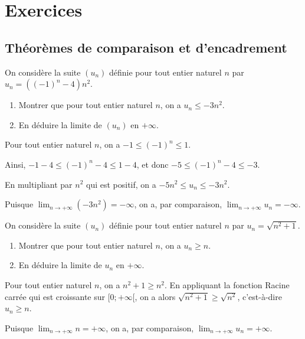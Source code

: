 \documentclass[11pt,fleqn, openany]{book} %
\begin{document}


\chapter{Exercices}


\section*{Théorèmes de comparaison et d'encadrement}

\begin{exercise}On considère la suite $(u_n)$ définie pour tout entier naturel $n$ par $u_n=((-1)^n-4)n^2$.
\begin{enumerate}
\item Montrer que pour tout entier naturel $n$, on a $u_n \leqslant -3n^2$.
\item En déduire la limite de $(u_n)$ en $+\infty$.
\end{enumerate}\end{exercise}

\begin{solution}Pour tout entier naturel $n$, on a $-1 \leqslant (-1)^n \leqslant 1$. 

Ainsi, $-1-4 \leqslant (-1)^n -4\leqslant 1-4$, et donc $-5 \leqslant (-1)^n-4 \leqslant -3$.

En multipliant par $n^2$ qui est positif, on a $-5n^2 \leqslant u_n \leqslant -3n^2$.

Puisque $\displaystyle\lim_{n \to + \infty} (-3n^2)=-\infty$, on a, par comparaison, $\displaystyle\lim_{n \to + \infty}u_n=-\infty$.\end{solution}




\begin{exercise}On considère la suite $(u_n)$ définie pour tout entier naturel $n$ par $u_n=\sqrt{n^2+1}$.
\begin{enumerate}
\item Montrer que pour tout entier naturel $n$, on a $u_n \geqslant n$.
\item En déduire la limite de $u_n$ en $+\infty$.
\end{enumerate}\end{exercise}

\begin{solution}Pour tout entier naturel $n$, on a $n^2+1 \geqslant n^2$. En appliquant la fonction Racine carrée qui est croissante sur $[0;+\infty[$, on a alors $\sqrt{n^2+1} \geqslant \sqrt{n^2}$, c'est-à-dire $u_n \geqslant n$.

Puisque $\displaystyle\lim_{n \to + \infty} n=+\infty$, on a, par comparaison, $\displaystyle\lim_{n \to + \infty}u_n=+\infty$.\end{solution}
\end{document}

